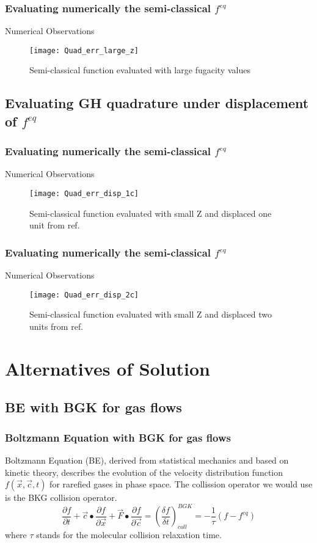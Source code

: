 \documentclass[11pt,fleqn]{beamer}
\begin{document}
\begin{frame}
	\frametitle{Evaluating numerically the semi-classical $f^{eq}$}
	Numerical Observations
	\begin{figure}[large_z]
	\centering
	\texttt{[image: Quad\_err\_large\_z]}%
	\caption{Semi-classical function evaluated with large fugacity values}
	\end{figure}
\end{frame}

\subsection{Evaluating GH quadrature under displacement of $f^{eq}$}
\begin{frame}
	\frametitle{Evaluating numerically the semi-classical $f^{eq}$}
	Numerical Observations
	\begin{figure}[disp_a_1]
	\centering
	\texttt{[image: Quad\_err\_disp\_1c]}%
	\caption{Semi-classical function evaluated with small Z and displaced one unit from ref.}
	\end{figure}
\end{frame}

\begin{frame}
	\frametitle{Evaluating numerically the semi-classical $f^{eq}$}
	Numerical Observations
	\begin{figure}[disp_a_2]
	\centering
	\texttt{[image: Quad\_err\_disp\_2c]}%
	\caption{Semi-classical function evaluated with small Z and displaced two units from ref.}
	\end{figure}
\end{frame}

\section{Alternatives of Solution}
\subsection{BE with BGK for gas flows}

\begin{frame}
	\frametitle{Boltzmann Equation with BGK for gas flows}
	Boltzmann Equation (BE), derived from statistical mechanics and based on kinetic theory, describes the evolution of the velocity distribution function $f(\vec{x},\vec{c},t)$ for rarefied gases in phase space. The collission operator we would use is the BKG collision operator.
	\begin{equation}
	\frac{\partial{f}}{\partial{t}} +
	\vec{c}\bullet\frac{\partial{f}}{\partial{\vec{x}}} +
	\vec{F}\bullet\frac{\partial{f}}{\partial{\vec{c}}} = 
	\left( \frac{\delta f}{\delta t}\right )^{BGK}_{coll} = -\frac{1}{\tau}(f-f^{eq})
	\end{equation}
	where $\tau$ stands for the molecular collision relaxation time.
\end{frame}
\end{document}
